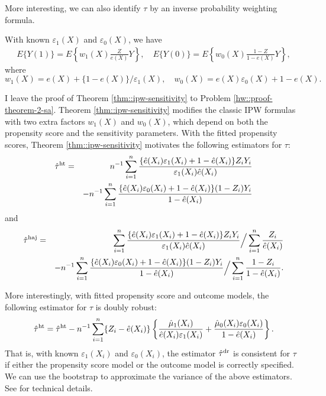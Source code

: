 More interesting, we can also identify $\tau$ by an inverse probability weighting formula.

\begin{theorem}\label{thm::ipw-sensitivity}
With known $\varepsilon_1(X)$ and $ \varepsilon_0(X) $, we have 
\begin{eqnarray*} 
E\{ Y(1) \} = 
E\left\{ w_1(X) \frac{Z}{e(X)}  Y  \right\}  ,\quad
 E\{Y(0)\} = E\left\{ w_0(X) \frac{1-Z}{1-e(X)} Y \right\},
\end{eqnarray*}
where
$$
w_1(X) = e(X) + \{1-e(X)\}/ \varepsilon_1(X) ,\quad
w_0(X) = e(X)  \varepsilon_0(X) + 1- e(X). 
$$
\end{theorem}


 
 

I leave the proof of Theorem \ref{thm::ipw-sensitivity} to Problem \ref{hw::proof-theorem-2-sa}. 
Theorem \ref{thm::ipw-sensitivity} modifies the classic  IPW  formulas with two extra factors $w_1(X) $ and $w_0(X) $, which depend on both the propensity score and the sensitivity parameters. With the fitted propensity scores, Theorem \ref{thm::ipw-sensitivity} motivates the following estimators for $\tau$: 
\begin{eqnarray*} 
\hat\tau^{\textup{ht}} &=&  n^{-1} \sum_{i=1}^n \frac{ \{ \hat{e}(X_i)\varepsilon_1(X_i) + 1-\hat{e}(X_i) \} Z_iY_i     }{  \varepsilon_1(X_i)  \hat e(X_i)  } \\
&&- n^{-1} \sum_{i=1}^n  \frac{ \{  \hat e(X_i)  \varepsilon_0(X_i) + 1- \hat e(X_i)  \} (1-Z_i) Y_i }{ 1- \hat e(X_i)} 
\end{eqnarray*}
and
\begin{eqnarray*} 
\hat\tau^{\textup{haj}} &=&   \sum_{i=1}^n \frac{ \{ \hat{e}(X_i)\varepsilon_1(X_i) + 1-\hat{e}(X_i) \} Z_iY_i     }{  \varepsilon_1(X_i)  \hat  e(X_i)  }  \Big / \sum_{i=1}^n \frac{Z_i}{ \hat{e}(X_i)  }   \\
&&- n^{-1} \sum_{i=1}^n  \frac{ \{  \hat  e(X_i)  \varepsilon_0(X_i) + 1- \hat e(X_i)  \} (1-Z_i) Y_i }{ 1- \hat e(X_i)} \Big / \sum_{i=1}^n \frac{1-Z_i}{ 1- \hat{e}(X_i)  } .
\end{eqnarray*}





More interestingly, with fitted propensity score and outcome models, the following estimator for $\tau$ is doubly robust:
\begin{eqnarray*}
\hat{\tau}^{\textup{ht}} = \hat\tau^{\textup{ht}} 
- n^{-1} \sum_{i=1}^n \{Z_i- \hat e(X_i)\}  \left\{   \frac{  \hat  \mu_1(X_i) }{  \hat e(X_i) \varepsilon_1(X_i)  }    + \frac{  \hat  \mu_0(X_i)\varepsilon_0(X_i)  }{ 1-  \hat  e(X_i) } \right\}.
\end{eqnarray*}
That is, with known $\varepsilon_1(X_i) $ and $\varepsilon_0(X_i) $, the estimator  $\hat{\tau}^{\textup{dr}} $ is consistent for $\tau$ if either the propensity score model or the outcome model is correctly specified. We can use the bootstrap to approximate the variance of the above estimators. See \citet{luding2023flexible} for technical details. 




